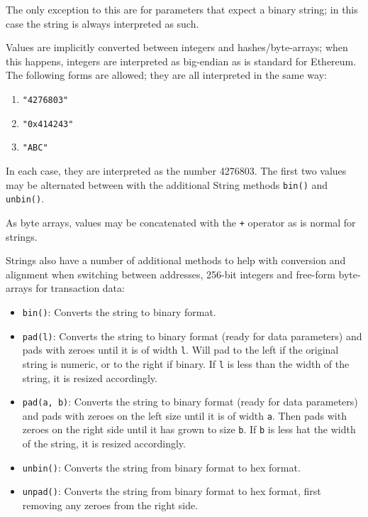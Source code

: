 \documentclass[9pt,oneside]{amsart}
\begin{document}
The only exception to this are for parameters that expect a binary string; in this case the string is always interpreted as such.

Values are implicitly converted between integers and hashes/byte-arrays; when this happens, integers are interpreted as big-endian as is standard for Ethereum. The following forms are allowed; they are all interpreted in the same way:

\begin{enumerate}
\item \texttt{"4276803"}
\item \texttt{"0x414243"}
\item \texttt{"ABC"}
\end{enumerate}

In each case, they are interpreted as the number 4276803. The first two values may be alternated between with the additional String methods \texttt{bin()} and \texttt{unbin()}.

As byte arrays, values may be concatenated with the \texttt{+} operator as is normal for strings.

Strings also have a number of additional methods to help with conversion and alignment when switching between addresses, 256-bit integers and free-form byte-arrays for transaction data:

\begin{itemize}
\item \texttt{bin()}: Converts the string to binary format.
\item \texttt{pad(l)}: Converts the string to binary format (ready for data parameters) and pads with zeroes until it is of width \texttt{l}. Will pad to the left if the original string is numeric, or to the right if binary. If \texttt{l} is less than the width of the string, it is resized accordingly.
\item \texttt{pad(a, b)}: Converts the string to binary format (ready for data parameters) and pads with zeroes on the left size until it is of width \texttt{a}. Then pads with zeroes on the right side until it has grown to size \texttt{b}. If \texttt{b} is less hat the width of the string, it is resized accordingly.
\item \texttt{unbin()}: Converts the string from binary format to hex format.
\item \texttt{unpad()}: Converts the string from binary format to hex format, first removing any zeroes from the right side.
\end{itemize}
\end{document}
